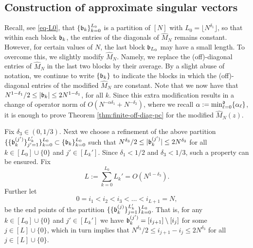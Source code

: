\documentclass{amsart}
\numberwithin{equation}{section}
\def\corAB{}
\def\corOZ{}
\begin{document}
\subsection*{Construction of approximate singular vectors}
Recall, \corOZ{see \eqref{eq-L0},} that
$\{\mathfrak{b}_k\}_{k=0}^{L_0}$ is a partition of $[N]$ with
$L_0=\lfloor N^{\delta_1} \rfloor$, so that
within each block $\mathfrak{b}_k$, the entries of the diagonals of
$\hat{M}_N$ remains constant. However, for certain values of $N$, the
last block $\mathfrak{b}_{L_0}$ may have a small length. To overcome this, we
slightly modify $\hat{M}_N$. Namely, we replace the \corAB{(off)-}diagonal entries of
$\hat{M}_N$ in the last two blocks by their  average.
By a slight abuse of notation, we continue to write $\{\mathfrak{b}_k\}$ to
indicate the blocks in which the \corAB{(off)-}diagonal entries of \corAB{the modified} $\hat{M}_N$ are constant.
Note that we now have that $N^{1-\delta_1}/2 \le |\mathfrak{b}_k| \le 2 N^{1-\delta_1}$, \corAB{for all $k$}. Since this extra modification results in a change of operator norm of
$O(N^{-\alpha \delta_1}+N^{-\delta_2})$, \corAB{where we recall $\alpha:=\min_{\ell=0}^{\mathfrak{d}}\{\alpha_\ell\}$}, it is enough to prove
Theorem \ref{thm:finite-off-diag-pc} for the modified $\hat{M}_N(z)$.

{Fix $\delta_3 \in (0,1/3)$}. Next we choose a refinement of the above partition $\{\{\mathfrak{b}_k^{(j')}\}_{j'=1}^{L_k'}\}_{k=0}^{L_0} \subset \{\mathfrak{b}_k\}_{k=0}^{L_0}$ such that $N^{\delta_3}/2 \le |\mathfrak{b}_k^{(j')}| \le 2N^{\delta_3}$ for all $k \in [L_0]\cup \{0\}$ and $j' \in [L_k']$. Since $\delta_1<1/2$ and
$\delta_3 <1/3$,
such a property can be ensured.
Fix
\begin{equation}
  \label{eq-L}
  \corOZ{  L:=\sum_{k=0}^{L_0} L_k'=O(N^{1-\delta_3}).}
\end{equation}
Further let
\[
  0 = i_1 < i_2 < i_3 < \dots  < i_{L+1} = N,
\]
\corAB{be} the end points of the partition $\{\{\mathfrak{b}_k^{(j)}\}_{j=1}^{L_k'}\}_{k=0}^{L_0}$. That is, for any $k \in [L_0] \cup\{0\}$ and $j' \in [L_k']$ we have $\mathfrak{b}_k^{(j')}=[i_{j+1}]\setminus [i_j]$ for some $j \in [L] \cup\{0\}$, which in turn implies that $N^{\delta_3}/2 \le i_{j+1} - i_j \le 2N^{\delta_3}$ for all $j \in [L] \cup \{0\}$.
\end{document}
